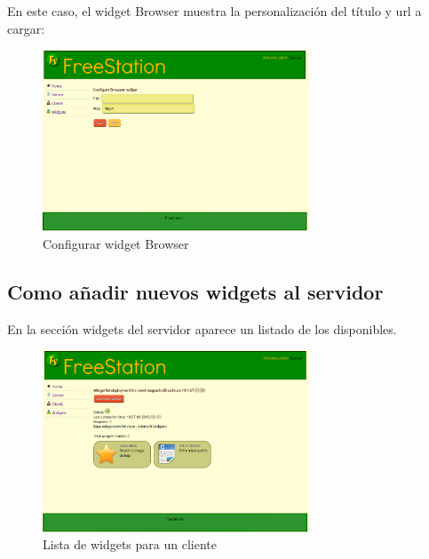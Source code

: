     \newpage
    En este caso, el widget Browser muestra la personalización del título y url
    a cargar:
    
   \begin{figure}[ht]
        \begin{center}
            \includegraphics[width=300px]{src/img/configure-widget-browser.png}
            \caption[Configurar widget Browser]
              {Configurar widget Browser}
        \end{center}
    \end{figure}
    
    \subsection{Como añadir nuevos widgets al servidor}
    
    En la sección widgets del servidor aparece un listado de los disponibles.
    
    \newpage
    
    \begin{figure}[ht]
        \begin{center}
            \includegraphics[width=300px]{src/img/widget-for-client.png}
            \caption[Lista de widgets para un cliente]
              {Lista de widgets para un cliente}
        \end{center}
    \end{figure}
    
